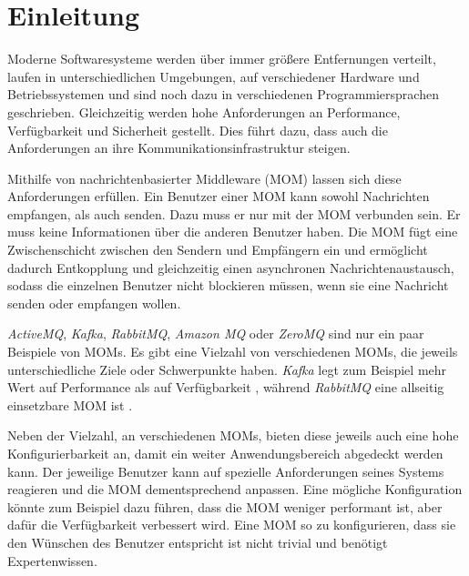 
\chapter{Einleitung}
\label{ch:Introduction}
Moderne Softwaresysteme werden über immer größere Entfernungen verteilt, laufen in unterschiedlichen Umgebungen, auf verschiedener Hardware und Betriebssystemen und sind noch dazu in verschiedenen Programmiersprachen geschrieben. Gleichzeitig werden hohe Anforderungen an Performance, Verfügbarkeit und Sicherheit gestellt. Dies führt dazu, dass auch die Anforderungen an ihre Kommunikationsinfrastruktur steigen. \par
Mithilfe von nachrichtenbasierter Middleware (MOM) lassen sich diese Anforderungen erfüllen. Ein Benutzer einer MOM kann sowohl Nachrichten empfangen, als auch senden. Dazu muss er nur mit der MOM verbunden sein. Er muss keine Informationen über die anderen Benutzer haben. Die MOM fügt eine Zwischenschicht zwischen den Sendern und Empfängern ein und ermöglicht dadurch Entkopplung und gleichzeitig einen asynchronen Nachrichtenaustausch, sodass die einzelnen Benutzer nicht blockieren müssen, wenn sie eine Nachricht senden oder empfangen wollen. \par
\emph{ActiveMQ}, \emph{Kafka}, \emph{RabbitMQ}, \emph{Amazon MQ} oder \emph{ZeroMQ} sind nur ein paar Beispiele von MOMs. Es gibt eine Vielzahl von verschiedenen MOMs, die jeweils unterschiedliche Ziele oder Schwerpunkte haben. \emph{Kafka} legt zum Beispiel mehr Wert auf Performance als auf Verfügbarkeit \cite{kafka}, während \emph{RabbitMQ} eine allseitig einsetzbare MOM ist \cite{rabbitmq}. \par
Neben der Vielzahl, an verschiedenen MOMs, bieten diese jeweils auch eine hohe Konfigurierbarkeit an, damit ein weiter Anwendungsbereich abgedeckt werden kann. Der jeweilige Benutzer kann auf spezielle Anforderungen seines Systems reagieren und die MOM dementsprechend anpassen. Eine mögliche Konfiguration könnte zum Beispiel dazu führen, dass die MOM weniger performant ist, aber dafür die Verfügbarkeit verbessert wird. Eine MOM so zu konfigurieren, dass sie den Wünschen des Benutzer entspricht ist nicht trivial und benötigt Expertenwissen. 

